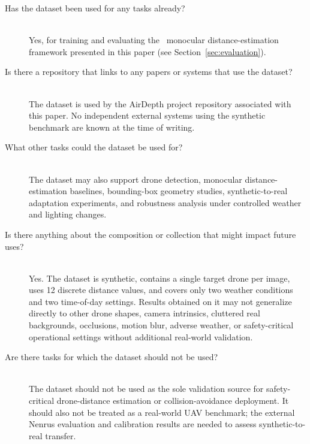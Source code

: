 \begin{description}
    \item[Has the dataset been used for any tasks already?] \hfill \\{}
    Yes, for training and evaluating the \airdepth\ monocular
    distance-estimation framework presented in this paper (see
    Section~\ref{sec:evaluation}).

    \item[Is there a repository that links to any papers or systems that use the dataset?] \hfill \\{}
    The dataset is used by the AirDepth project repository associated with this
    paper. No independent external systems using the synthetic benchmark are
    known at the time of writing.

    \item[What other tasks could the dataset be used for?] \hfill \\{}
    The dataset may also support drone detection, monocular distance-estimation
    baselines, bounding-box geometry studies, synthetic-to-real adaptation
    experiments, and robustness analysis under controlled weather and lighting
    changes.

    \item[Is there anything about the composition or collection that might impact future uses?] \hfill \\{}
    Yes. The dataset is synthetic, contains a single target drone per image,
    uses 12 discrete distance values, and covers only two weather conditions
    and two time-of-day settings. Results obtained on it may not generalize
    directly to other drone shapes, camera intrinsics, cluttered real
    backgrounds, occlusions, motion blur, adverse weather, or safety-critical
    operational settings without additional real-world validation.

    \item[Are there tasks for which the dataset should not be used?] \hfill \\{}
    The dataset should not be used as the sole validation source for
    safety-critical drone-distance estimation or collision-avoidance
    deployment. It should also not be treated as a real-world UAV benchmark;
    the external Nenrus evaluation and calibration results are needed to assess
    synthetic-to-real transfer.
\end{description}
